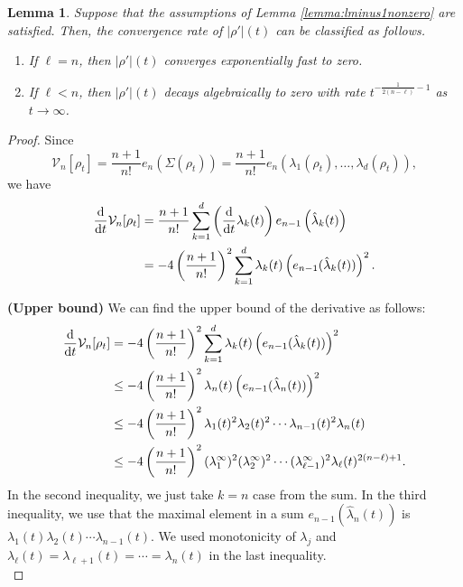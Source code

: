 \documentclass[11pt,reqno]{amsart}
\numberwithin{figure}{section}
\def\d {{\partial}}
\def\d{\mathrm{d}}
\newcommand{\dm}{d}
\renewcommand{\d}{  {\textup{d}} }
\newcommand{\dt} {    {  \textup{d}t   }    }
\newtheorem{lemma}{Lemma}[section]
\begin{document}
\begin{lemma}\label{lem:metric-speed-rate}
Suppose that the assumptions of Lemma \ref{lemma:lminus1nonzero} are satisfied. Then, the convergence rate of $|\rho'|(t)$ can be classified as follows.
\begin{enumerate}
\item If $\ell=n$, then $|\rho'|(t)$ converges exponentially fast to zero.

\item If $\ell<n$, then $|\rho'|(t)$ decays algebraically to zero with rate $t^{-\frac{1}{2(n-\ell)}-1}$ as $t\to\infty$.
\end{enumerate}
\end{lemma}

\begin{proof}
Since 
\[
\mathcal{V}_n[\rho_t]=\frac{n+1}{n!}e_n(\Sigma(\rho_t))=\frac{n+1}{n!}e_n(\lambda_1(\rho_t), \ldots, \lambda_\dm(\rho_t)),
\]
we have
\begin{align*}
\frac{\d}{\d t}\mathcal{V}_n[\rho_t]&=\frac{n+1}{n!}\sum_{k=1}^\dm \left(\frac{\d}{\dt}\lambda_k(t)\right)e_{n-1}\left(\hat{\lambda}_k(t)\right)\\
&=-4\left(\frac{n+1}{n!}\right)^2\sum_{k=1}^d\lambda_k(t)\left(e_{n-1}(\hat{\lambda}_k(t))\right)^2.
\end{align*}


\noindent\textbf{(Upper bound)} We can find the upper bound of the derivative as follows:
\begin{align*}
\frac{\d}{\d t}\mathcal{V}_n[\rho_t]
&=-4\left(\frac{n+1}{n!}\right)^2\sum_{k=1}^d\lambda_k(t)\left(e_{n-1}(\hat{\lambda}_k(t))\right)^2\\
&\leq -4\left(\frac{n+1}{n!}\right)^2\lambda_n(t)\left(e_{n-1}(\hat{\lambda}_n(t))\right)^2\\
&\leq-4\left(\frac{n+1}{n!}\right)^2\lambda_1(t)^2\lambda_2(t)^2\cdots\lambda_{n-1}(t)^2\lambda_n(t)\\
&\leq -4\left(\frac{n+1}{n!}\right)^2(\lambda_1^\infty)^2(\lambda_2^\infty)^2\cdots(\lambda_{\ell-1}^\infty)^2\lambda_{\ell}(t)^{2(n-\ell)+1}.
\end{align*}
In the second inequality, we just take $k=n$ case from the sum. In the third inequality, we use that the maximal element in a sum $e_{n-1}(\hat{\lambda}_n(t))$ is $\lambda_1(t)\lambda_2(t)\cdots\lambda_{n-1}(t)$. We used monotonicity of $\lambda_j$ and $\lambda_{\ell}(t)=\lambda_{\ell+1}(t)=\cdots=\lambda_n(t)$ in the last inequality.\\



\end{proof}
\end{document}
